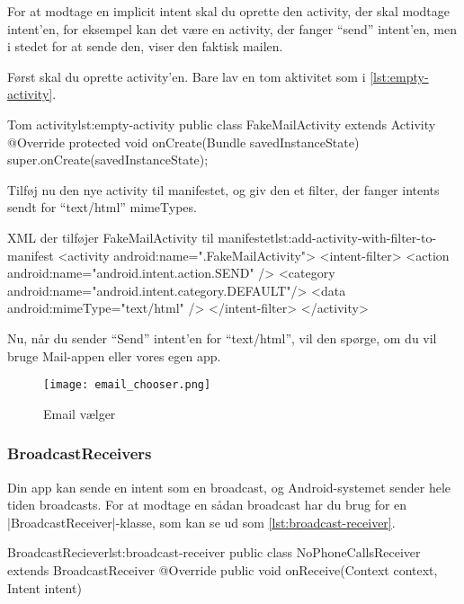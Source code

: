 For at modtage en implicit intent skal du oprette den activity, der skal modtage intent'en, for eksempel kan det være en activity, der fanger ``send'' intent'en, men i stedet for at sende den, viser den faktisk mailen.

Først skal du oprette activity'en. Bare lav en tom aktivitet som i \autoref{lst:empty-activity}.

\begin{JavaCode}{Tom activity}{lst:empty-activity}
	public class FakeMailActivity extends Activity {
		@Override
		protected void onCreate(Bundle savedInstanceState) {
			super.onCreate(savedInstanceState);
		}
	}
\end{JavaCode}

Tilføj nu den nye activity til manifestet, og giv den et filter, der fanger intents sendt for ``text/html'' mimeTypes.

\begin{XmlCode}{XML der tilføjer FakeMailActivity til manifestet}{lst:add-activity-with-filter-to-manifest}
	<activity android:name=".FakeMailActivity">
		<intent-filter>
			<action android:name="android.intent.action.SEND" />
			<category android:name="android.intent.category.DEFAULT"/>
			<data android:mimeType="text/html" />
		</intent-filter>
	</activity>
\end{XmlCode}

Nu, når du sender ``Send'' intent'en for ``text/html'', vil den spørge, om du vil bruge Mail-appen eller vores egen app.

\begin{figure}[h]
	\begin{center}
		\texttt{[image: email\_chooser.png]}
		\caption{Email vælger}
		\label{fig:android:activities:email_chooser}
	\end{center}
\end{figure}

\subsubsection{BroadcastReceivers}

Din app kan sende en intent som en broadcast, og Android-systemet sender hele tiden broadcasts. For at modtage en sådan broadcast har du brug for en \JavaInline|BroadcastReceiver|-klasse, som kan se ud som \autoref{lst:broadcast-receiver}.

\begin{JavaCode}{BroadcastReciever}{lst:broadcast-receiver}
	public class NoPhoneCallsReceiver extends BroadcastReceiver {
		@Override
		public void onReceive(Context context, Intent intent) {
		}
	}
\end{JavaCode}

